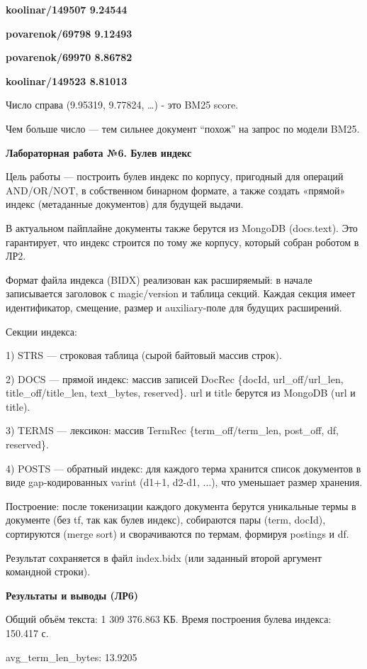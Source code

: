 \documentclass[12pt,a4paper]{article}
\begin{document}
\textbf{koolinar/149507 9.24544}

\textbf{povarenok/69798 9.12493}

\textbf{povarenok/69970 8.86782}

\textbf{koolinar/149523 8.81013}

Число справа (9.95319, 9.77824, \ldots) - это BM25 score.

Чем больше число --- тем сильнее документ ``похож'' на запрос по модели
BM25.

\textbf{Лабораторная работа №6. Булев индекс}

Цель работы --- построить булев индекс по корпусу, пригодный для
операций AND/OR/NOT, в собственном бинарном формате, а также создать
«прямой» индекс (метаданные документов) для будущей выдачи.

В актуальном пайплайне документы также берутся из MongoDB (docs.text).
Это гарантирует, что индекс строится по тому же корпусу, который собран
роботом в ЛР2.

Формат файла индекса (BIDX) реализован как расширяемый: в начале
записывается заголовок с magic/version и таблица секций. Каждая секция
имеет идентификатор, смещение, размер и auxiliary-поле для будущих
расширений.

Секции индекса:

1) STRS --- строковая таблица (сырой байтовый массив строк).

2) DOCS --- прямой индекс: массив записей DocRec \{docId,
url\_off/url\_len, title\_off/title\_len, text\_bytes, reserved\}. url и
title берутся из MongoDB (url и title).

3) TERMS --- лексикон: массив TermRec \{term\_off/term\_len, post\_off,
df, reserved\}.

4) POSTS --- обратный индекс: для каждого терма хранится список
документов в виде gap-кодированных varint (d1+1, d2-d1, ...), что
уменьшает размер хранения.

Построение: после токенизации каждого документа берутся уникальные термы
в документе (без tf, так как булев индекс), собираются пары (term,
docId), сортируются (merge sort) и сворачиваются по термам, формируя
postings и df.

Результат сохраняется в файл index.bidx (или заданный второй аргумент
командной строки).

\textbf{Результаты и выводы (ЛР6)}

Общий объём текста: 1 309 376.863 КБ. Время построения булева индекса:
150.417 с.

avg\_term\_len\_bytes: 13.9205
\end{document}

